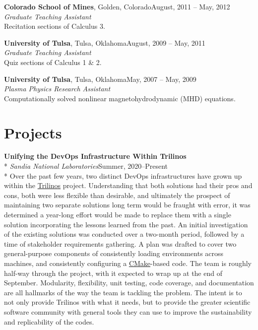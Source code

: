 \documentclass[margin,line,pifont,palatino,10pt]{res}
\begin{document}
\begin{resume}
{\bf Colorado School of Mines}, Golden, Colorado\hfill August, 2011 -- May, 2012\\
{\em Graduate Teaching Assistant}\\
Recitation sections of Calculus 3.

{\bf University of Tulsa}, Tulsa, Oklahoma\hfill August, 2009 -- May, 2011\\
{\em Graduate Teaching Assistant}\\
Quiz sections of Calculus 1 \& 2.

{\bf University of Tulsa}, Tulsa, Oklahoma\hfill May, 2007 -- May, 2009\\
{\em Plasma Physics Research Assistant}\\
Computationally solved nonlinear magnetohydrodynamic (MHD) equations.






\vspace{1.5mm}
\section{\sc Projects}

{\bf Unifying the DevOps Infrastructure Within Trilinos}\\*
{\it Sandia National Laboratories}\hfill Summer, 2020--Present\\*
Over the past few years, two distinct DevOps infrastructures have grown up within the \href{https://trilinos.github.io}{Trilinos} project.  Understanding that both solutions had their pros and cons, both were less flexible than desirable, and ultimately the prospect of maintaining two separate solutions long term would be fraught with error, it was determined a year-long effort would be made to replace them with a single solution incorporating the lessons learned from the past.  An initial investigation of the existing solutions was conducted over a two-month period, followed by a time of stakeholder requirements gathering.  A plan was drafted to cover two general-purpose components of consistently loading environments across machines, and consistently configuring a \href{https://cmake.org}{CMake}-based code.  The team is roughly half-way through the project, with it expected to wrap up at the end of September.  Modularity, flexibility, unit testing, code coverage, and documentation are all hallmarks of the way the team is tackling the problem.  The intent is to not only provide Trilinos with what it needs, but to provide the greater scientific software community with general tools they can use to improve the sustainability and replicability of the codes.


\end{resume}
\end{document}
